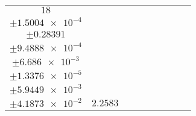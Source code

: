 \documentclass[8pt]{article}
\begin{document}
\begin{longtable}[l]{c c c c c c c c c}
$\num{18}$ & \begin{tabular}[c]{@{}c@{}}$\num{3.0306e-2}$ \\ $\pm\num{1.5004e-4}$\end{tabular} & \begin{tabular}[c]{@{}c@{}}$\num{0.50105}$ \\ $\pm\num{0.28391}$\end{tabular} & \begin{tabular}[c]{@{}c@{}}$\num{8.2047}$ \\ $\pm\num{9.4888e-4}$\end{tabular} & \begin{tabular}[c]{@{}c@{}}$\num{3.6348e+3}$ \\ $\pm\num{6.686e-3}$\end{tabular} & \begin{tabular}[c]{@{}c@{}}$\num{7.2716}$ \\ $\pm\num{1.3376e-5}$\end{tabular} & \begin{tabular}[c]{@{}c@{}}$\num{1.1737}$ \\ $\pm\num{5.9449e-3}$\end{tabular} & \begin{tabular}[c]{@{}c@{}}$\num{4.0715}$ \\ $\pm\num{4.1873e-2}$\end{tabular} & $\num{2.2583}$\\
\bottomrule
\end{longtable}
\end{document}
